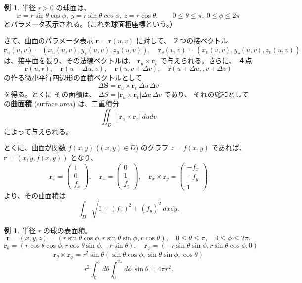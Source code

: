 \documentclass[a4paper]{jsarticle}
\theoremstyle{definition}
\newtheorem{Example}[Theorem]{例}
\theoremstyle{remark}
\begin{document}
\begin{Example}
半径 $r>0$ の球面は、
\[
x = r\sin\theta\cos\phi,\  
y = r\sin\theta\cos\phi,\  
z = r\cos\theta,\qquad 
0 \leq \theta \leq \pi,\ 0 \leq \phi \leq 2\pi
\]
とパラメータ表示される。（これを球面極座標という。）
\end{Example}

さて、曲面のパラメータ表示 ${\boldsymbol r} = {\boldsymbol r}(u,v)$ に対して、
２つの接ベクトル
\[
{\boldsymbol r}_u(u,v) = (x_u(u,v),y_u(u,v),z_u(u,v)), 
\quad 
{\boldsymbol r}_v(u,v) = (x_v(u,v),y_v(u,v),z_v(u,v))
\]
は、接平面を張り、その法線ベクトルは、
${\boldsymbol r}_u\times {\boldsymbol r}_v$ で与えられる。さらに、
４点 
\[
{\boldsymbol r}(u,v), 
\quad 
{\boldsymbol r}(u+\Delta u,v), 
\quad
{\boldsymbol r}(u,v + \Delta v), 
\quad
{\boldsymbol r}(u + \Delta u, ,v + \Delta v)
\]
の作る微小平行四辺形の面積ベクトルとして
\[
\Delta{\boldsymbol S} = {\boldsymbol r}_u\times {\boldsymbol r}_v\, \Delta u\,\Delta v
\]
を得る。とくに その面積は、
$\Delta S = |{\boldsymbol r}_u\times {\boldsymbol r}_v| \Delta u\,\Delta v$ であり、
それの総和としての\textbf{曲面積} (surface area) は、二重積分
\[
\iint_D |{\boldsymbol r}_u\times {\boldsymbol r}_v|\, dudv
\]
によって与えられる。

とくに、曲面が関数 $f(x,y)$ ($(x,y) \in D$) のグラフ $z = f(x,y)$ であれば、
${\boldsymbol r} = (x,y, f(x,y))$ となり、
\[
  {\boldsymbol r}_x =
  \begin{pmatrix}
    1\\
    0\\
    f_x
  \end{pmatrix},
  \quad
  {\boldsymbol r}_x =
  \begin{pmatrix}
    0\\
    1\\
    f_y
  \end{pmatrix},
  \quad
  {\boldsymbol r}_x \times {\boldsymbol r}_y =
  \begin{pmatrix}
    -f_x\\
    -f_y\\
    1
  \end{pmatrix}
\]
より、その曲面積は
\[
  \int_D \sqrt{1 + (f_x)^2 + (f_y)^2}\, dxdy. 
\]


\begin{Example}
半径 $r$ の球の表面積。
\[
{\boldsymbol r} = (x,y,z) = (r\sin\theta\cos\phi,r\sin\theta\sin\phi,r\cos\theta), 
\quad 
0 \leq \theta \leq \pi, \quad 
0 \leq \phi \leq 2\pi.
\]
\[
{\boldsymbol r}_\theta = (r\cos\theta\cos\phi,r\cos\theta\sin\phi,-r\sin\theta), 
\quad
{\boldsymbol r}_\phi = (-r\sin\theta\sin\phi,r\sin\theta\cos\phi,0)
\]
\[
{\boldsymbol r}_\theta\times {\boldsymbol r}_\phi 
= r^2\sin\theta(\sin\theta\cos\phi,\sin\theta\sin\phi,\cos\theta)
\]
\[
r^2\int_0^\pi d\theta \int_0^{2\pi}d\phi\, \sin\theta 
= 4\pi r^2.
\]
\end{Example}
\end{document}
